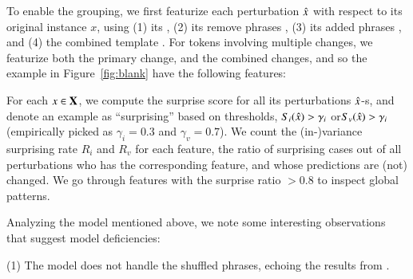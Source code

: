 To enable the grouping, we first featurize each perturbation $\hat{x}$ with respect to its original instance $x$, using 
(1) its \tagstr {}, 
(2) its remove phrases , 
(3) its added phrases , and 
(4) the combined template .
For tokens involving multiple changes, we featurize both the primary change, and the combined changes, and so the example in Figure~\ref{fig:blank} have the following features:

For each $x \in \mathbf{X}$, we compute the surprise score for all its perturbations $\hat{x}$-s, and denote an example as ``surprising'' based on thresholds, \ie $S_i(\hat{x}) > \gamma_i$ or$S_v(\hat{x}) > \gamma_i$ (empirically picked as $\gamma_i=0.3$ and $\gamma_v=0.7$).
We count the (in-)variance surprising rate $R_i$ and $R_v$ for each feature, \ie the ratio of surprising cases out of all perturbations who has the corresponding feature, and whose predictions are (not) changed.
We go through features with the surprise ratio $> 0.8$ to inspect global patterns.

Analyzing the \nli model mentioned above, we note some interesting observations that suggest model deficiencies:

(1) The model does not handle the shuffled phrases, echoing the results from \citet{mccoy2019right}.


